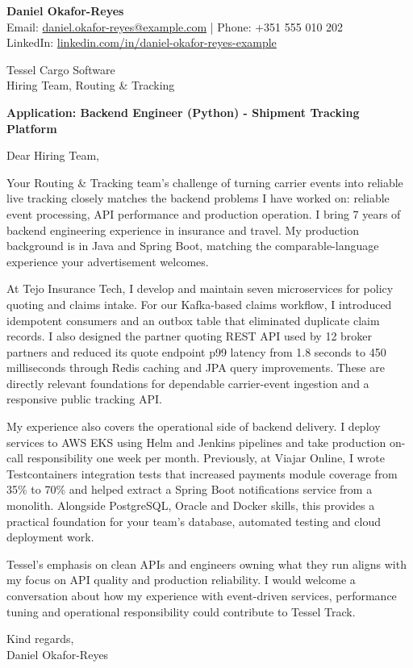 \documentclass[11pt,a4paper]{article}
\begin{document}
{\Large\bfseries\color{primarycolor} Daniel Okafor-Reyes}\\
Email: \href{mailto:daniel.okafor-reyes@example.com}{daniel.okafor-reyes@example.com} | Phone: +351 555 010 202\\
LinkedIn: \href{https://linkedin.com/in/daniel-okafor-reyes-example}{linkedin.com/in/daniel-okafor-reyes-example}

Tessel Cargo Software\\
Hiring Team, Routing \& Tracking

\textbf{Application: Backend Engineer (Python) - Shipment Tracking Platform}

Dear Hiring Team,

Your Routing \& Tracking team's challenge of turning carrier events into reliable live tracking closely matches the backend problems I have worked on: reliable event processing, API performance and production operation. I bring 7 years of backend engineering experience in insurance and travel. My production background is in Java and Spring Boot, matching the comparable-language experience your advertisement welcomes.

At Tejo Insurance Tech, I develop and maintain seven microservices for policy quoting and claims intake. For our Kafka-based claims workflow, I introduced idempotent consumers and an outbox table that eliminated duplicate claim records. I also designed the partner quoting REST API used by 12 broker partners and reduced its quote endpoint p99 latency from 1.8 seconds to 450 milliseconds through Redis caching and JPA query improvements. These are directly relevant foundations for dependable carrier-event ingestion and a responsive public tracking API.

My experience also covers the operational side of backend delivery. I deploy services to AWS EKS using Helm and Jenkins pipelines and take production on-call responsibility one week per month. Previously, at Viajar Online, I wrote Testcontainers integration tests that increased payments module coverage from 35\% to 70\% and helped extract a Spring Boot notifications service from a monolith. Alongside PostgreSQL, Oracle and Docker skills, this provides a practical foundation for your team's database, automated testing and cloud deployment work.

Tessel's emphasis on clean APIs and engineers owning what they run aligns with my focus on API quality and production reliability. I would welcome a conversation about how my experience with event-driven services, performance tuning and operational responsibility could contribute to Tessel Track.

Kind regards,\\
Daniel Okafor-Reyes
\end{document}
